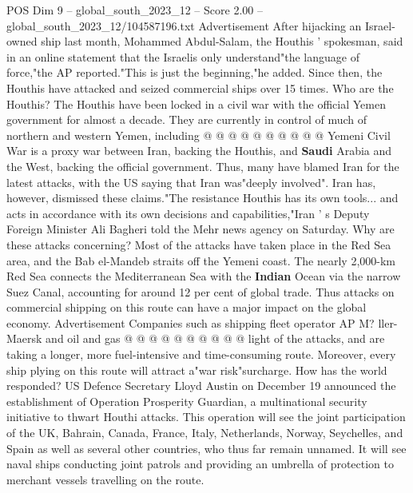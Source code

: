 \begin{textsample}{POS Dim 9 – global\_south\_2023\_12 – Score 2.00 – global\_south\_2023\_12/104587196.txt}
Advertisement After hijacking an Israel-owned ship last month, Mohammed Abdul-Salam, the Houthis ' spokesman, said in an online statement that the Israelis only understand"the language of force,"the AP reported."This is just the beginning,"he added.
Since then, the Houthis have attacked and seized commercial ships over 15 times.
Who are the Houthis?
The Houthis have been locked in a civil war with the official Yemen government for almost a decade.
They are currently in control of much of northern and western Yemen, including @ @ @ @ @ @ @ @ @ @ Yemeni Civil War is a proxy war between Iran, backing the Houthis, and \textbf{Saudi} Arabia and the West, backing the official government.
Thus, many have blamed Iran for the latest attacks, with the US saying that Iran was"deeply involved".
Iran has, however, dismissed these claims."The resistance Houthis has its own tools... and acts in accordance with its own decisions and capabilities,"Iran ' s Deputy Foreign Minister Ali Bagheri told the Mehr news agency on Saturday.
Why are these attacks concerning?
Most of the attacks have taken place in the Red Sea area, and the Bab el-Mandeb straits off the Yemeni coast.
The nearly 2,000-km Red Sea connects the Mediterranean Sea with the \textbf{Indian} Ocean via the narrow Suez Canal, accounting for around 12 per cent of global trade.
Thus attacks on commercial shipping on this route can have a major impact on the global economy.
Advertisement Companies such as shipping fleet operator AP M? ller-Maersk and oil and gas @ @ @ @ @ @ @ @ @ @ light of the attacks, and are taking a longer, more fuel-intensive and time-consuming route.
Moreover, every ship plying on this route will attract a"war risk"surcharge.
How has the world responded?
US Defence Secretary Lloyd Austin on December 19 announced the establishment of Operation Prosperity Guardian, a multinational security initiative to thwart Houthi attacks.
This operation will see the joint participation of the UK, Bahrain, Canada, France, Italy, Netherlands, Norway, Seychelles, and Spain as well as several other countries, who thus far remain unnamed.
It will see naval ships conducting joint patrols and providing an umbrella of protection to merchant vessels travelling on the route.

\end{textsample}
